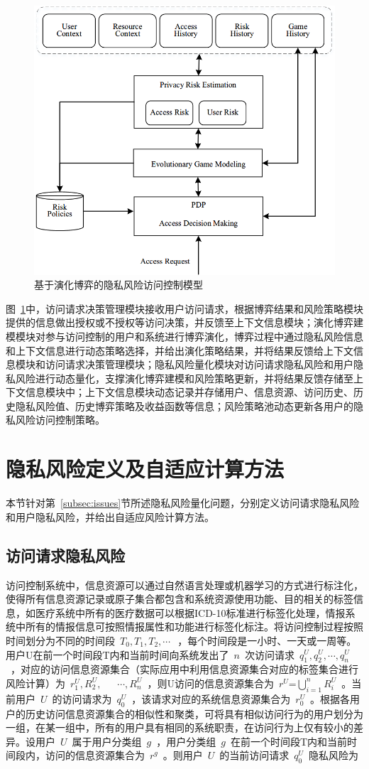 \begin{figure}[htbp]
	\centering
	\includegraphics[width = 0.6\linewidth]{./figures/Evolutionary-game-Rabac.png}
	\caption{基于演化博弈的隐私风险访问控制模型}
	\label{fig:Evolutionary-game-Rabac}
\end{figure}

图~\ref{fig:Evolutionary-game-Rabac}中，访问请求决策管理模块接收用户访问请求，根据博弈结果和风险策略模块提供的信息做出授权或不授权等访问决策，并反馈至上下文信息模块；演化博弈建模模块对参与访问控制的用户和系统进行博弈演化，博弈过程中通过隐私风险信息和上下文信息进行动态策略选择，并给出演化策略结果，并将结果反馈给上下文信息模块和访问请求决策管理模块；隐私风险量化模块对访问请求隐私风险和用户隐私风险进行动态量化，支撑演化博弈建模和风险策略更新，并将结果反馈存储至上下文信息模块中；上下文信息模块动态记录并存储用户、信息资源、访问历史、历史隐私风险值、历史博弈策略及收益函数等信息；风险策略池动态更新各用户的隐私风险访问控制策略。

\section{隐私风险定义及自适应计算方法}
本节针对第~\ref{subsec:issues}节所述隐私风险量化问题，分别定义访问请求隐私风险和用户隐私风险，并给出自适应风险计算方法。
\subsection{访问请求隐私风险}

访问控制系统中，信息资源可以通过自然语言处理或机器学习的方式进行标注化，使得所有信息资源记录或原子集合都包含和系统资源使用功能、目的相关的标签信息，如医疗系统中所有的医疗数据可以根据ICD-10标准进行标签化处理，情报系统中所有的情报信息可按照情报属性和功能进行标签化标注。将访问控制过程按照时间划分为不同的时间段~${{T}_{0}},{{T}_{1}},{{T}_{2}},\cdots ~$~，每个时间段是一小时、一天或一周等。用户U在前一个时间段T内和当前时间向系统发出了~$n$~次访问请求~$q_{1}^{U},q_{2}^{U},\cdots ,q_{n}^{U}$~，对应的访问信息资源集合（实际应用中利用信息资源集合对应的标签集合进行风险计算）为~$r_{1}^{U},R_{2}^{U},~$~ ~$\cdots ,R_{n}^{U}$~，则U访问的信息资源集合为~$r_{{}}^{U}\text{=}\bigcup\nolimits_{i=1}^{n}{R_{i}^{U}}$~。当前用户~$U$~的访问请求为~$q_{0}^{U}$~，该请求对应的系统信息资源集合为~$r_{0}^{U}$~。根据各用户的历史访问信息资源集合的相似性和聚类，可将具有相似访问行为的用户划分为一组，在某一组中，所有的用户具有相同的系统职责，在访问行为上仅有较小的差异。设用户~$U$~属于用户分类组~$g$~，用户分类组~$g$~在前一个时间段T内和当前时间段内，访问的信息资源集合为~$r_{{}}^{g}$~。则用户~$U$~的当前访问请求~$q_{0}^{U}$~隐私风险为

